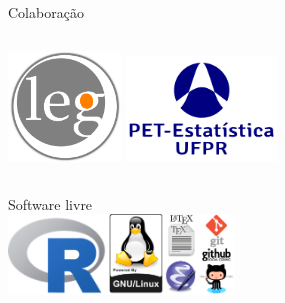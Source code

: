 \begin{frame}
  \frametitle{}
  \framesubtitle{}

  \begin{center}
    Colaboração
  \end{center}
  \begin{columns}[t]
    \hfill\includegraphics[width=3cm]{./images/leg.png}
    \hfill
    \includegraphics[width=4cm]{./images/PET.png}\hfill
  \end{columns}
  
\begin{center}
  Software livre\\ \vspace{1em}
  \includegraphics[width=6cm]{./images/logos.png}
\end{center}

\end{frame}
